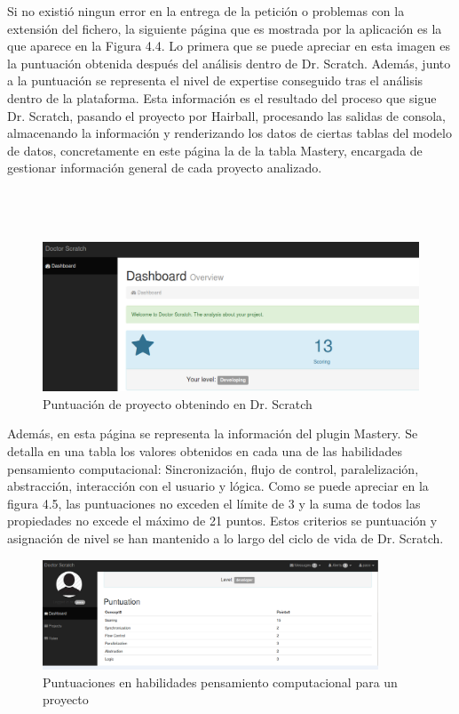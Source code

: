\documentclass[a4paper, 12pt]{book}
\begin{document}
Si no existió ningun error en la entrega de la petición o problemas con la extensión del
fichero, la siguiente página que es mostrada por la aplicación es la que aparece en la
Figura 4.4. Lo primera que se puede apreciar en esta imagen es la puntuación obtenida 
después del análisis dentro de Dr. Scratch. Además, junto a la puntuación se representa
el nivel de expertise conseguido tras el análisis dentro de la plataforma. Esta 
información es el resultado del proceso que sigue Dr. Scratch, pasando el proyecto por
Hairball, procesando las salidas de consola, almacenando la información y renderizando los
datos de ciertas tablas del modelo de datos, concretamente en este página la de la tabla
Mastery, encargada de gestionar información general de cada proyecto analizado. \\ \\ \\ \\

 \begin{figure}
		\graphicspath{{img/}}
    \includegraphics[bb=0 0 800 600, width=12cm, keepaspectratio]{puntuacion.png}
		\caption{Puntuación de proyecto obtenindo en Dr. Scratch}
    \label{figura:foro_hilos}
 \end{figure} 

Además, en esta página se representa la información del plugin Mastery. Se detalla
en una tabla los valores obtenidos en cada una de las habilidades pensamiento
computacional: Sincronización, flujo de control, paralelización, abstracción,
interacción con el usuario y lógica. Como se puede apreciar en la figura 4.5, las
puntuaciones no exceden el límite de 3 y la suma de todos las propiedades no excede
el máximo de 21 puntos. Estos criterios se puntuación y asignación de nivel se han
mantenido a lo largo del ciclo de vida de Dr. Scratch. \\

\begin{figure}[h]
	\graphicspath{{img/}}
  \includegraphics[bb=0 0 800 600, width=10cm, keepaspectratio]{scoring.png}
	\caption{Puntuaciones en habilidades pensamiento computacional para un proyecto}
  \label{figura:foro_hilos}
\end{figure}
\end{document}
